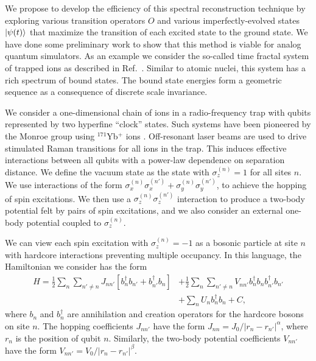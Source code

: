 \documentclass[aps,longbibliography,final,prl,onecolumn,superscriptaddress,nofootinbib,floatfix,11pt]{revtex4-1}
\begin{document}
We propose to develop the efficiency of this spectral reconstruction technique by exploring various transition operators $O$ and various imperfectly-evolved states  $\ket{\psi(t)}$ that maximize the transition  of each excited state to the ground state.
We have done some preliminary work to show that this method is viable for analog quantum simulators.  As an example we consider the so-called time fractal system of trapped ions as described in Ref.~\cite{Lee:2019gtc}.  Similar to atomic nuclei, this system has a rich spectrum of bound states.  The bound state energies form a geometric sequence as a consequence of discrete scale invariance.   


We consider a one-dimensional chain of ions in
a radio-frequency
trap with qubits represented by two hyperfine ``clock''
states.  Such systems have been pioneered by the Monroe group using   $^{171}$Yb$^{+}$ ions  \cite{Zhang:2017a,Zhang:2017b}.
  Off-resonant laser beams are used
to drive stimulated Raman transitions for all ions in the trap.  This induces
effective interactions between
all qubits with
a power-law dependence on separation distance.
 We define the vacuum state as the state  with $\sigma_z^{(n)}=1$ for all sites $n$.
 We use interactions of the form $\sigma_x^{(n)}\sigma_x^{(n')}+\sigma_y^{(n)}\sigma_y^{(n')}$,
to achieve the hopping of spin excitations.  We then use a
$\sigma_z^{(n)}\sigma_z^{(n')}$ interaction to produce  a two-body potential
felt by pairs of spin excitations, and we also consider an external one-body
potential coupled to $\sigma_z^{(n)}$. 

We can view each spin
excitation  with $\sigma_z^{(n)}=-1$ as a bosonic particle
at site $n$ with hardcore interactions preventing multiple occupancy.   In
this language, the Hamiltonian we consider  has the form 
\begin{align}
H =\frac{1}{2} \sum_{n}\sum_{n'\ne n} J_{nn'}[b^{\dagger}_n b_{n'} +b^{\dagger}_{n'}
b_n] & + \frac{1}{2}\sum_{n}\sum_{n' \ne n}V^{}_{nn'}b^{\dagger}_n b_n b^{\dagger}_{n'}
b_{n'} \nonumber\\
& + \sum_{n}U^{}_{n}b^{\dagger}_n b_n+C, \label{time_fractal}
\end{align}
where $b_n$ and $b^{\dagger}_n$ are annihilation and creation operators for
the hardcore bosons on site $n$.  The  hopping coefficients $J_{nn'}$ have
the form
$J_{nn} = J_0/|r_n-r_{n'}|^{\alpha}$, where $r_n$ is the position of qubit $n$.  Similarly, the two-body potential coefficients $V_{nn'}$ have the
form $V_{nn'} = V_0/|r_n-r_{n'}|^{\beta}$.   
\end{document}
